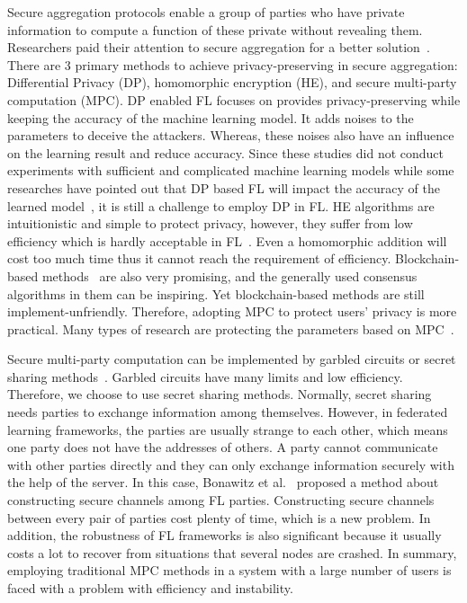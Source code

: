 Secure aggregation protocols enable a group of parties who have private information to compute a function of these private without revealing them. Researchers paid their attention to secure aggregation for a better solution~\cite{shi2011privacy,RobustAgg,Bonawitz19,Nike,PrivFL}. There are 3 primary methods to achieve privacy-preserving in secure aggregation: Differential Privacy (DP), homomorphic encryption (HE), and secure multi-party computation (MPC). DP enabled FL focuses on provides privacy-preserving while keeping the accuracy of the machine learning model. It adds noises to the parameters to deceive the attackers. Whereas, these noises also have an influence on the learning result and reduce accuracy. Since these studies did not conduct experiments with sufficient and complicated machine learning models while some researches have pointed out that DP based FL will impact the accuracy of the learned model~\cite{Two-Phase}, it is still a challenge to employ DP in FL. HE algorithms are intuitionistic and simple to protect privacy, however, they suffer from low efficiency which is hardly acceptable in FL~\cite{HESurvey}. Even a homomorphic addition will cost too much time thus it cannot reach the requirement of efficiency. Blockchain-based methods~\cite{DeepChain,Lu2020,On-Device} are also very promising, and the generally used consensus algorithms in them can be inspiring. Yet blockchain-based methods are still implement-unfriendly. Therefore, adopting MPC to protect users' privacy is more practical. Many types of research are protecting the parameters based on MPC~\cite{Practical,Two-Phase,Weighted,Hybrid}. 

Secure multi-party computation can be implemented by garbled circuits or secret sharing methods~\cite{Shamir}. Garbled circuits have many limits and low efficiency. Therefore, we choose to use secret sharing methods. Normally, secret sharing needs parties to exchange information among themselves. However, in federated learning frameworks, the parties are usually strange to each other, which means one party does not have the addresses of others. A party cannot communicate with other parties directly and they can only exchange information securely with the help of the server. In this case, Bonawitz et al.~\cite{Practical} proposed a method about constructing secure channels among FL parties. Constructing secure channels between every pair of parties cost plenty of time, which is a new problem. In addition, the robustness of FL frameworks is also significant because it usually costs a lot to recover from situations that several nodes are crashed. In summary, employing traditional MPC methods in a system with a large number of users is faced with a problem with efficiency and instability.

